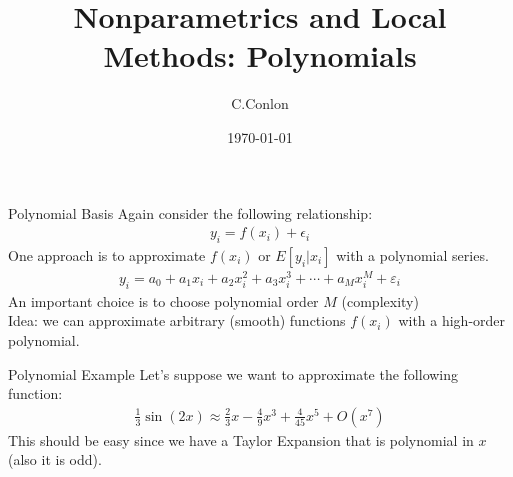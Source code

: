 

\title [Nonparametrics]{Nonparametrics and Local Methods: Polynomials}
\author{C.Conlon}
\date{\today}


\begin{frame}
\titlepage
\end{frame}

\begin{frame}{Polynomial Basis}
Again consider the following relationship:
\begin{align*}
y_i = f(x_i) + \epsilon_i
\end{align*}
One approach is to approximate $f(x_i)$ or $E[y_i | x_i]$ with a \alert{polynomial series}.
\begin{align*}
y_i = a_0  + a_1 x_i + a_2 x_i^2 + a_3 x_i^3+ \cdots+ a_M x_i^M + \varepsilon_i
\end{align*}
An important choice is to choose polynomial order $M$ (complexity)\\
Idea: we can approximate \alert{arbitrary (smooth) functions} $f(x_i)$ with a high-order polynomial.
\end{frame}

\begin{frame}{Polynomial Example}
Let's suppose we want to approximate the following function:
\begin{align*}
\frac{1}{3} \sin (2 x) \approx \frac{2}{3} x - \frac{4}{9} x^3 + \frac{4}{45} x^5 + O(x^7)
\end{align*}
This should be easy since we have a \alert{Taylor Expansion} that is polynomial in $x$ (also it is odd).
\end{frame}

